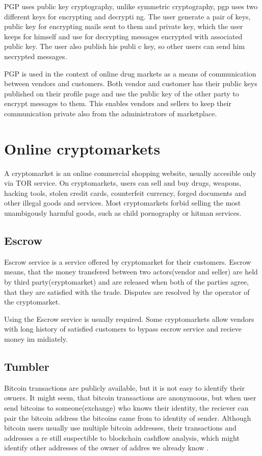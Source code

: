 \documentclass[
  digital, %
  table,   %
  lof,     %
  lot,     %
  oneside
]{fithesis3}
\begin{document}
PGP uses public key cryptography, unlike symmetric cryptography, pgp uses two different keys for encrypting and decrypti
ng.
The user generate a pair of keys, public key for encrypting mails sent to them and private key, which the user
 keeps for himself and use for decrypting messages encrypted with associated public key. The user also publish his publi
c
 key, so other users can send him necrypted messages.

PGP is used in the context of online drug markets as a means of communication between vendors and customers.
Both vendor and customer has their public keys published on their profile page and use the public key of the other
party to encrypt messages to them. This enables vendors and sellers to keep their communication private also 
from the administrators of marketplace.

\section{Online cryptomarkets}
A cryptomarket is an online commercial shopping website, usually accesible only via TOR service.
On cryptomarkets, users can sell and buy  drugs, weapons, hacking tools, stolen credit cards,
counterfeit currency, forged documents and other illegal goods and services.
Most cryptomarkets forbid selling the most unambigously harmful goods, such as
 child pornography or hitman services.

\subsection{Escrow}
Escrow service is a service offered by cryptomarket for their customers.
Escrow means, that the money transfered between two actors(vendor and seller) are held by third party(cryptomarket)
 and are released when both of the parties agree, that they are satisfied with the trade.
 Disputes are resolved by the operator of the cryptomarket.

 Using the Escrow service is usually required.
 Some cryptomarkets allow vendors with long history of satisfied customers to bypass escrow service and recieve money im
midiately.
 
\subsection{Tumbler}

Bitcoin transactions are publicly available, but it is not easy to identify their owners.
It might seem, that bitcoin transactions are anonymoous, but when user send bitcoins to
someone(exchange) who knows their identity, the reciever can pair the bitcoin address the bitcoins came from
to identity of sender. Although bitcoin users usually use multiple bitcoin addresses, their transactions and addresses a
re still 
suspectible to blockchain cashflow analysis, which might identify other addresses of the owner of addres we already know
.
\end{document}
